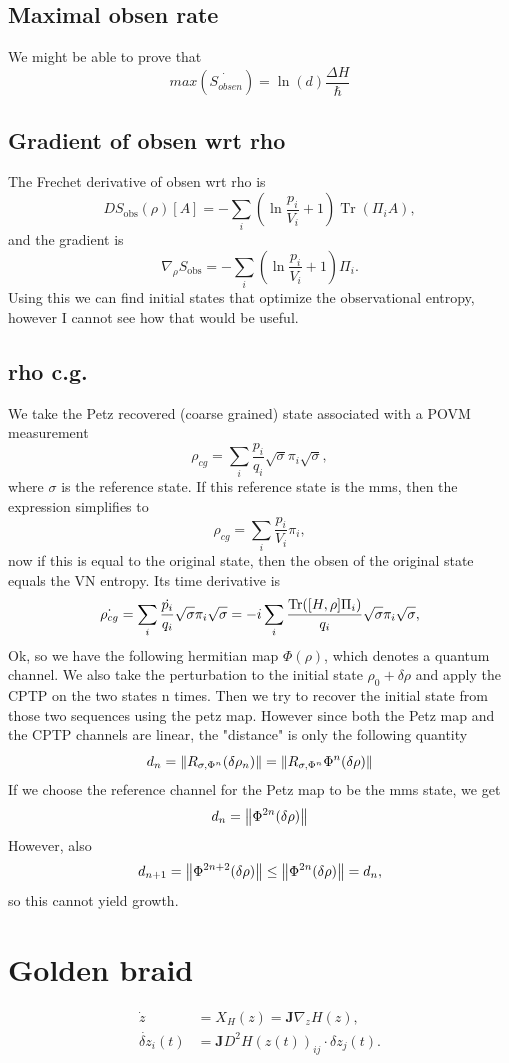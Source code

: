 \documentclass{article}
\begin{document}
\subsection{Maximal obsen rate}
We might be able to prove that 
\[
    max(\dot{S_{obsen}}) = \ln (d) \frac{\Delta H}{\hbar}
\]

\subsection{Gradient of obsen wrt rho}
The Frechet derivative of obsen wrt rho is 
\[
    DS_{\mathrm{obs}}(\rho)[A]=-\sum_i\left(\ln\frac{p_i}{V_i}+1\right)\operatorname{Tr}(\Pi_iA),
\]
and the gradient is 
\[
    \nabla_\rho S_{\mathrm{obs}}=-\sum_i\left(\ln\frac{p_i}{V_i}+1\right)\Pi_i.
\]
Using this we can find initial states that optimize the observational entropy, however I cannot see how that would be useful.
\subsection{rho c.g.}
We take the Petz recovered (coarse grained) state associated with a POVM measurement
\[
    \rho_{cg} = \sum_i\frac{p_i}{q_i}\sqrt{\sigma}\pi_i\sqrt{\sigma},
\]
where $\sigma$ is the reference state. If this reference state is the mms, then the expression simplifies to 
\[
    \rho_{cg} = \sum_i\frac{p_i}{V_i}\pi_i,
\]
now if this is equal to the original state, then the obsen of the original state equals the VN entropy. Its time derivative is
\[
    \Dot{\rho_{cg}} = \sum_i\frac{\Dot{p_i}}{q_i}\sqrt{\sigma}\pi_i\sqrt{\sigma} = -i\sum_i\frac{\text{Tr}([H,\rho]\Pi_i)}{q_i}\sqrt{\sigma}\pi_i\sqrt{\sigma},
\]
Ok, so we have the following hermitian map $\Phi(\rho)$, which denotes a quantum channel. We also take the perturbation to the initial state $\rho_0 + \delta\rho$ and apply the CPTP on the two states n times. Then we try to recover the initial state from those two sequences using the petz map. However since both the Petz map and the CPTP channels are linear, the "distance" is only the following quantity
\[
    d_n = \norm{R_{\sigma, \Phi^n}(\delta\rho_n)} = \norm{R_{\sigma, \Phi^n}\Phi^n(\delta\rho)}
\]
If we choose the reference channel for the Petz map to be the mms state, we get
\[
    d_n = \norm{\Phi^{2n}(\delta\rho)}
\]
However, also 
\[
    d_{n+1} =  \norm{\Phi^{2n+2}(\delta\rho)} \leq  \norm{\Phi^{2n}(\delta\rho)} = d_n,
\]
so this cannot yield growth. 
\section{Golden braid}
\begin{tcolorbox}[enhanced,colframe=gold,colback=gold!12,boxrule=2.5pt,arc=5mm,left=10mm,right=10mm,top=2mm,bottom=4mm,drop fuzzy shadow={gold!70!yellow},borderline={1pt}{3pt}{yellow!85!white},borderline={0.8pt}{4.5pt}{gold!80!orange}]\begin{align}\dot{z}&=X_H(z)=\mathbf{J}\nabla_z H(z),\\\dot{\delta z}_i(t)&=\mathbf{J}D^2H(z(t))_{ij}\cdot\delta z_j(t).\end{align}
\end{tcolorbox}
\end{document}
